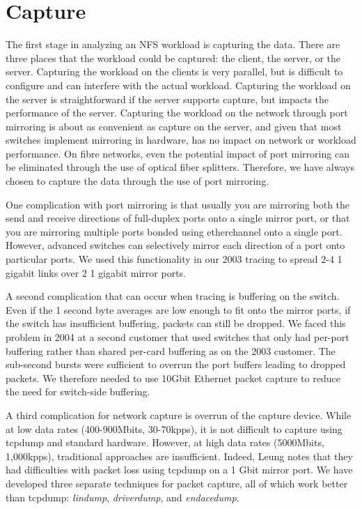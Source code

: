 \section{Capture}
\label{sec:capture}

The first stage in analyzing an NFS workload is capturing the data.
There are three places that the workload could be captured: the
client, the server, or the server.  Capturing the workload on the
clients is very parallel, but is difficult to configure and can
interfere with the actual workload.  Capturing the workload on the
server is straightforward if the server supports capture, 
but impacts the performance of the
server.  Capturing the workload on the network through port mirroring
is about as convenient as capture on the server, and given that most
switches implement mirroring in hardware, has no impact on network or
workload performance.  On fibre networks, even the potential impact of
port mirroring can be eliminated through the use of optical fiber
splitters. Therefore, we have always chosen to capture the
data through the use of port mirroring.

One complication with port mirroring is that usually you are mirroring
both the send and receive directions of full-duplex ports onto a
single mirror port, or that you are mirroring multiple ports bonded
using etherchannel onto a single port. However, advanced switches can
selectively mirror each direction of a port onto particular ports.  We
used this functionality in our 2003 tracing to spread 2-4 1 gigabit
links over 2 1 gigabit mirror ports.

A second complication that can occur when tracing is buffering on the
switch.  Even if the 1 second byte averages are low enough to fit onto
the mirror ports, if the switch has insufficient buffering, packets
can still be dropped.  We faced this problem in 2004 at a second
customer that used switches that only had per-port buffering rather
than shared per-card buffering as on the 2003 customer.  The
sub-second bursts were sufficient to overrun the port buffers leading
to dropped packets.  We therefore needed to use 10Gbit Ethernet packet
capture to reduce the need for switch-side buffering.

A third complication for network capture is overrun of the capture
device.  While at low data rates (400-900Mbits, 30-70kpps), it is not
difficult to capture using tcpdump and standard hardware.  However, at
high data rates (5000Mbits, 1,000kpps), traditional approaches are
insufficient. Indeed, Leung\cite{LeungUsenix08} notes that they 
had difficulties with packet loss using tcpdump on a 1 Gbit mirror
port.  We have developed three separate techniques for packet capture,
all of which work better than tcpdump: {\it lindump}, {\it
driverdump}, and {\it endacedump}.

